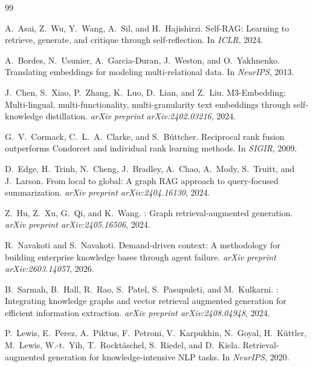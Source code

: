 \documentclass[11pt,a4paper]{article}
\begin{document}
\begin{thebibliography}{99}

A.~Asai, Z.~Wu, Y.~Wang, A.~Sil, and H.~Hajishirzi.
\newblock Self-{RAG}: Learning to retrieve, generate, and critique through self-reflection.
\newblock In \emph{ICLR}, 2024.

A.~Bordes, N.~Usunier, A.~Garcia-Duran, J.~Weston, and O.~Yakhnenko.
\newblock Translating embeddings for modeling multi-relational data.
\newblock In \emph{NeurIPS}, 2013.

J.~Chen, S.~Xiao, P.~Zhang, K.~Luo, D.~Lian, and Z.~Liu.
 {M3}-Embedding: Multi-lingual, multi-functionality, multi-granularity text embeddings through self-knowledge distillation.
\newblock \emph{arXiv preprint arXiv:2402.03216}, 2024.

G.~V.~Cormack, C.~L.~A.~Clarke, and S.~B{\"u}ttcher.
\newblock Reciprocal rank fusion outperforms {Condorcet} and individual rank learning methods.
\newblock In \emph{SIGIR}, 2009.

D.~Edge, H.~Trinh, N.~Cheng, J.~Bradley, A.~Chao, A.~Mody, S.~Truitt, and J.~Larson.
\newblock From local to global: A graph {RAG} approach to query-focused summarization.
\newblock \emph{arXiv preprint arXiv:2404.16130}, 2024.

Z.~Hu, Z.~Xu, G.~Qi, and K.~Wang.
: Graph retrieval-augmented generation.
\newblock \emph{arXiv preprint arXiv:2405.16506}, 2024.

R.~Navakoti and S.~Navakoti.
\newblock Demand-driven context: A methodology for building enterprise knowledge bases through agent failure.
\newblock \emph{arXiv preprint arXiv:2603.14057}, 2026.

B.~Sarmah, B.~Hall, R.~Rao, S.~Patel, S.~Pasupuleti, and M.~Kulkarni.
: Integrating knowledge graphs and vector retrieval augmented generation for efficient information extraction.
\newblock \emph{arXiv preprint arXiv:2408.04948}, 2024.

P.~Lewis, E.~Perez, A.~Piktus, F.~Petroni, V.~Karpukhin, N.~Goyal, H.~K{\"u}ttler, M.~Lewis, W.-t.~Yih, T.~Rockt{\"a}schel, S.~Riedel, and D.~Kiela.
\newblock Retrieval-augmented generation for knowledge-intensive {NLP} tasks.
\newblock In \emph{NeurIPS}, 2020.


\end{thebibliography}
\end{document}
